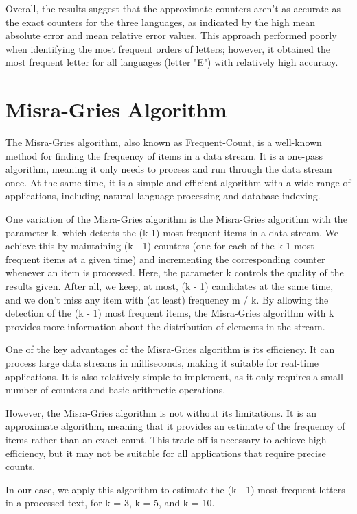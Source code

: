 \documentclass[]{revdetua}
\begin{document}
Overall, the results suggest that the approximate counters aren't as accurate as the exact counters for the three languages, as indicated by the high mean absolute error and mean relative error values. This approach performed poorly when identifying the most frequent orders of letters; however, it obtained the most frequent letter for all languages (letter "E") with relatively high accuracy.

\section{Misra-Gries Algorithm}

The Misra-Gries algorithm, also known as Frequent-Count, is a well-known method for finding the frequency of items in a data stream. It is a one-pass algorithm, meaning it only needs to process and run through the data stream once. At the same time, it is a simple and efficient algorithm with a wide range of applications, including natural language processing and database indexing.

One variation of the Misra-Gries algorithm is the Misra-Gries algorithm with the parameter k, which detects the (k-1) most frequent items in a data stream. We achieve this by maintaining (k - 1) counters (one for each of the k-1 most frequent items at a given time) and incrementing the corresponding counter whenever an item is processed. Here, the parameter k controls the quality of the results given. After all, we keep, at most, (k - 1) candidates at the same time, and we don't miss any item with (at least) frequency m / k. By allowing the detection of the (k - 1) most frequent items, the Misra-Gries algorithm with k provides more information about the distribution of elements in the stream.

One of the key advantages of the Misra-Gries algorithm is its efficiency. It can process large data streams in milliseconds, making it suitable for real-time applications. It is also relatively simple to implement, as it only requires a small number of counters and basic arithmetic operations. 

However, the Misra-Gries algorithm is not without its limitations. It is an approximate algorithm, meaning that it provides an estimate of the frequency of items rather than an exact count. This trade-off is necessary to achieve high efficiency, but it may not be suitable for all applications that require precise counts.

In our case, we apply this algorithm to estimate the (k - 1) most frequent letters in a processed text, for k = 3, k = 5, and k = 10.
\end{document}
